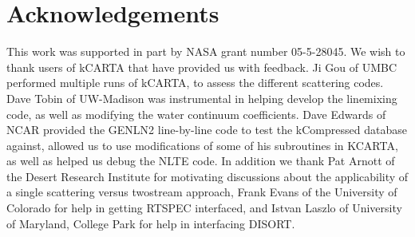 \documentclass[11pt]{article}
\newcommand{\kc}{\textsf{kCARTA}\xspace}
\begin{document}
\section{Acknowledgements}
This work was supported in part by NASA grant number 05-5-28045. We wish to 
thank users of kCARTA that have provided us with feedback. Ji Gou of UMBC 
performed multiple runs of \kc, to assess the different scattering codes. 
Dave Tobin of UW-Madison was instrumental in helping develop the \cd 
linemixing code, as well as modifying the water continuum coefficients. Dave 
Edwards of NCAR provided the {\sf GENLN2} line-by-line code to test the 
{\sf kCompressed} database against, allowed us to use modifications of some of 
his subroutines in {\sf KCARTA}, as well as helped us debug the NLTE code. 
In addition we thank Pat Arnott of the 
Desert Research Institute for motivating discussions about the applicability 
of a single scattering versus twostream approach, Frank Evans of the 
University of Colorado for help in getting RTSPEC interfaced, and Istvan 
Laszlo of University of Maryland, College Park for help in interfacing 
DISORT.



\end{document}
